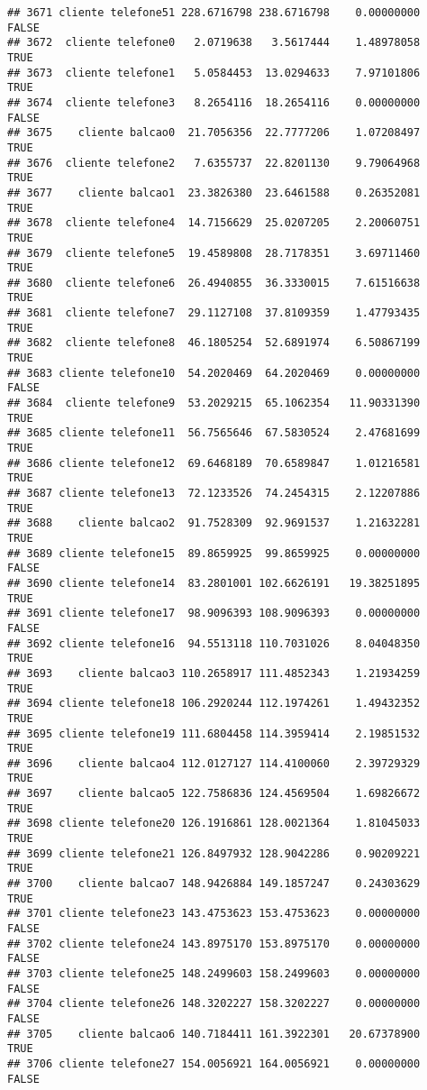 \documentclass[
]{article}
\begin{document}
\begin{verbatim}
## 3671 cliente telefone51 228.6716798 238.6716798    0.00000000    FALSE
## 3672  cliente telefone0   2.0719638   3.5617444    1.48978058     TRUE
## 3673  cliente telefone1   5.0584453  13.0294633    7.97101806     TRUE
## 3674  cliente telefone3   8.2654116  18.2654116    0.00000000    FALSE
## 3675    cliente balcao0  21.7056356  22.7777206    1.07208497     TRUE
## 3676  cliente telefone2   7.6355737  22.8201130    9.79064968     TRUE
## 3677    cliente balcao1  23.3826380  23.6461588    0.26352081     TRUE
## 3678  cliente telefone4  14.7156629  25.0207205    2.20060751     TRUE
## 3679  cliente telefone5  19.4589808  28.7178351    3.69711460     TRUE
## 3680  cliente telefone6  26.4940855  36.3330015    7.61516638     TRUE
## 3681  cliente telefone7  29.1127108  37.8109359    1.47793435     TRUE
## 3682  cliente telefone8  46.1805254  52.6891974    6.50867199     TRUE
## 3683 cliente telefone10  54.2020469  64.2020469    0.00000000    FALSE
## 3684  cliente telefone9  53.2029215  65.1062354   11.90331390     TRUE
## 3685 cliente telefone11  56.7565646  67.5830524    2.47681699     TRUE
## 3686 cliente telefone12  69.6468189  70.6589847    1.01216581     TRUE
## 3687 cliente telefone13  72.1233526  74.2454315    2.12207886     TRUE
## 3688    cliente balcao2  91.7528309  92.9691537    1.21632281     TRUE
## 3689 cliente telefone15  89.8659925  99.8659925    0.00000000    FALSE
## 3690 cliente telefone14  83.2801001 102.6626191   19.38251895     TRUE
## 3691 cliente telefone17  98.9096393 108.9096393    0.00000000    FALSE
## 3692 cliente telefone16  94.5513118 110.7031026    8.04048350     TRUE
## 3693    cliente balcao3 110.2658917 111.4852343    1.21934259     TRUE
## 3694 cliente telefone18 106.2920244 112.1974261    1.49432352     TRUE
## 3695 cliente telefone19 111.6804458 114.3959414    2.19851532     TRUE
## 3696    cliente balcao4 112.0127127 114.4100060    2.39729329     TRUE
## 3697    cliente balcao5 122.7586836 124.4569504    1.69826672     TRUE
## 3698 cliente telefone20 126.1916861 128.0021364    1.81045033     TRUE
## 3699 cliente telefone21 126.8497932 128.9042286    0.90209221     TRUE
## 3700    cliente balcao7 148.9426884 149.1857247    0.24303629     TRUE
## 3701 cliente telefone23 143.4753623 153.4753623    0.00000000    FALSE
## 3702 cliente telefone24 143.8975170 153.8975170    0.00000000    FALSE
## 3703 cliente telefone25 148.2499603 158.2499603    0.00000000    FALSE
## 3704 cliente telefone26 148.3202227 158.3202227    0.00000000    FALSE
## 3705    cliente balcao6 140.7184411 161.3922301   20.67378900     TRUE
## 3706 cliente telefone27 154.0056921 164.0056921    0.00000000    FALSE

\end{verbatim}
\end{document}
